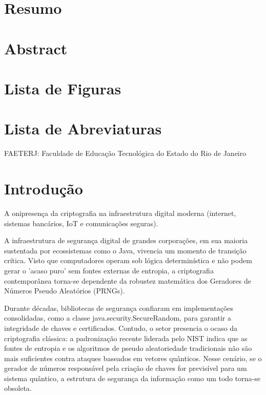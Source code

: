 \documentclass[
	12pt,				%
	openright,			%
	oneside,			%
	a4paper,			%
	portuguese,			%
	brazil				%
	]{abntex2}
\begin{document}
\imprimircapa
\imprimirfolhaderosto

\chapter{Resumo}

\chapter{Abstract}

\chapter{Lista de Figuras}

\chapter{Lista de Abreviaturas}

\boldmath FAETERJ: Faculdade de Educação Tecnológica do Estado do Rio de Janeiro 


\tableofcontents*
\cleardoublepage
\textual
\chapter{Introdução}

A onipresença da criptografia na infraestrutura digital moderna (internet, sistemas bancários, IoT e comunicações seguras).

A infraestrutura de segurança digital de grandes corporações, em sua maioria sustentada por ecossistemas como o Java, vivencia um momento de transição crítica. 
Visto que computadores operam sob lógica determinística e não podem gerar o 'acaso puro' sem fontes externas de entropia, a criptografia contemporânea torna-se dependente da robustez matemática dos Geradores de Números Pseudo Aleatórios (PRNGs). 

Durante décadas, bibliotecas de segurança confiaram em implementações consolidadas, como a classe java.security.SecureRandom, para garantir a integridade de chaves e certificados. 
Contudo, o setor presencia o ocaso da criptografia clássica: a padronização recente liderada pelo NIST indica que as fontes de entropia e os algoritmos de pseudo aleatoriedade tradicionais não são mais suficientes contra ataques baseados em vetores quânticos. 
Nesse cenário, se o gerador de números responsável pela criação de chaves for previsível para um sistema quântico, a estrutura de segurança da informação como um todo torna-se obsoleta. 
\end{document}
